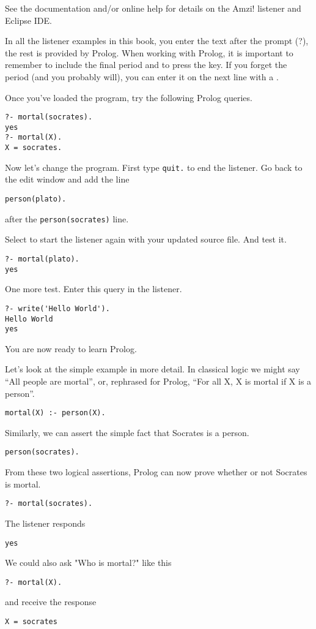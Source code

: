 See the documentation and/or online help for details on the Amzi! listener and
Eclipse IDE.

In all the listener examples in this book, you enter the text after the prompt
(?), the rest is provided by Prolog. When working with Prolog, it is important
to remember to include the final period  and to press the 
key. If you forget the period (and you probably will), you can enter it on the
next line with a .

Once you've loaded the program, try the following Prolog queries.
\begin{verbatim}
?- mortal(socrates).
yes
?- mortal(X).
X = socrates.
\end{verbatim}

Now let's change the program. First type \verb'quit.' to end the listener. Go
back to the edit window and add the line
\begin{verbatim}
person(plato).
\end{verbatim}
after the \verb|person(socrates)| line.

Select  to start the listener again with
your updated source file. And test it.

\begin{verbatim}
?- mortal(plato).
yes
\end{verbatim}

One more test. Enter this query in the listener.

\begin{verbatim}
?- write('Hello World').
Hello World
yes
\end{verbatim}

You are now ready to learn Prolog.


Let's look at the simple example in more detail. In classical logic we might say
``All people are mortal'', or, rephrased for Prolog, ``For all X, X is mortal if
X is a person''.

\begin{verbatim}
mortal(X) :- person(X).
\end{verbatim}
Similarly, we can assert the simple fact that Socrates is a person.
\begin{verbatim}
person(socrates).
\end{verbatim}
From these two logical assertions, Prolog can now prove whether or not Socrates is mortal.
\begin{verbatim}
?- mortal(socrates).
\end{verbatim}
The listener responds
\begin{verbatim}
yes
\end{verbatim}
We could also ask "Who is mortal?" like this
\begin{verbatim}
?- mortal(X).
\end{verbatim}
and receive the response
\begin{verbatim}
X = socrates
\end{verbatim}

